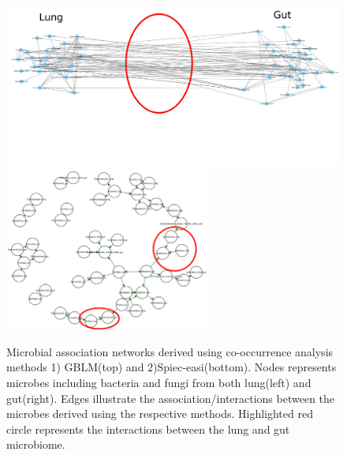 \begin{figure}[h]
	\centering
	\includegraphics[width=\textwidth]{image/ch2-gblm-all.png} 
	\includegraphics[width=0.6\textwidth]{image/ch2-se-all.png}
	\caption{Microbial association networks derived using co-occurrence analysis methods 1) GBLM(top) and 2)Spiec-easi(bottom). Nodes represents microbes including bacteria and fungi from both lung(left) and gut(right). Edges illustrate the association/interactions between the microbes derived using the respective methods. Highlighted red circle represents the interactions between the lung and gut microbiome.}
	\label{res2_fig2}
\end{figure}

